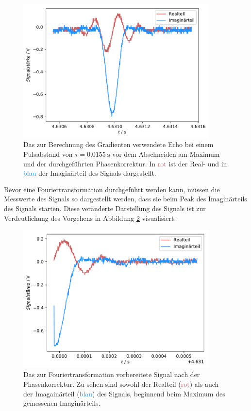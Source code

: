 \begin{figure}[H]
  \centering
  \includegraphics[width=0.9\textwidth]{../Auswertung/echo_vorher.pdf}
  \caption{Das zur Berechnung des Gradienten verwendete Echo bei einem Pulsabstand von $\tau = \SI{0.0155}{\second}$
  vor dem Abschneiden am Maximum und der durchgeführten
  Phasenkorrektur. In \textcolor{indianred}{rot} ist der Real- und in \textcolor{dodgerblue}{blau} der Imaginärteil des Signals dargestellt.}
  \label{fig:echo_vorher}
\end{figure} \noindent
Bevor eine Fouriertransformation durchgeführt werden kann, müssen die Messwerte des Signals so dargestellt werden, dass sie
beim Peak des Imaginärteils des Signals starten. Diese veränderte Darstellung des Signals ist zur Verdeutlichung des Vorgehens in
Abbildung \ref{fig:echo_ab} visualisiert.
\begin{figure}[H]
  \centering
  \includegraphics[width=0.9\textwidth]{../Auswertung/echo_phasenkorrektur.pdf}
  \caption{Das zur Fouriertransformation vorbereitete Signal nach der Phasenkorrektur. Zu sehen sind sowohl der Realteil (\textcolor{indianred}{rot}) als auch der
  Imagainärteil (\textcolor{dodgerblue}{blau}) des Signals, beginnend beim Maximum des gemessenen Imaginärteils.}
  \label{fig:echo_ab}
\end{figure} \noindent
